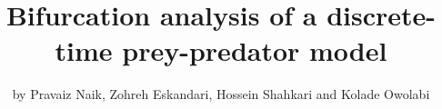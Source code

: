 \documentclass[]{beamer}
\title{Bifurcation analysis of a discrete-time prey-predator model}
\author{by Pravaiz Naik, Zohreh Eskandari, Hossein Shahkari and Kolade Owolabi}
\institute{Presented by Jacob Hauck}
\date{}
\begin{document}
	\frame{\titlepage}
	
	\begin{frame}{}
		
	\end{frame}
\end{document}
